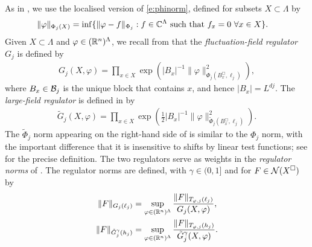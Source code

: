 As in \cite[(\ref{IE-e:PhiXdef})]{BS-rg-IE}, we use the localised version
of \eqref{e:phinorm}, defined for subsets $X \subset \Lambda$  by
\begin{align}
\label{e:PhiXdef}
    \|\varphi\|_{\Phi_j(X)}
    &=
    \inf \{ \|\varphi -f\|_{\Phi_j} :
    \text{$f \in \mathbb{C}^\Lambda$ such that $f_{x} = 0$
    $\forall x\in X$}\}.
\end{align}
Given $X \subset \Lambda$ and $\varphi \in ({\mathbb R}^n)^{\Lambda}$,
we recall from \cite[\eqref{IE-e:GPhidef}]{BS-rg-IE}
that the
\emph{fluctuation-field regulator} $G_j$
is defined by
\begin{align}
\label{e:GPhidef}
    G_j(X,\varphi)
    =
    \prod_{x \in X} \exp
    \left(|B_{x}|^{-1}\|\varphi\|_{\Phi_j (B_{x}^\Box,\ell_j )}^2 \right)
    ,
\end{align}
where $B_{x}\in \mathcal{B}_j$ is the unique block that contains $x$,
and hence $|B_x| = L^{dj}$.
The \emph{large-field regulator} is defined in \cite[\eqref{IE-e:9Gdef}]{BS-rg-IE} by
\begin{align}
\label{e:9Gdef}
    \tilde G_j  (X,\varphi)
    =
    \prod_{x \in X}
    \exp \left(
    \frac 12 |B_{x}|^{-1}\|\varphi\|_{\tilde\Phi_j (B_{x}^\Box,\ell_j)}^2
    \right)
    .
\end{align}
The $\tilde\Phi_j$ norm appearing on the right-hand side of  is
similar to the $\Phi_j$ norm, with the important difference that it is insensitive to
shifts by linear test functions; see \cite[\eqref{IE-e:Phitilnorm}]{BS-rg-IE} for the
precise definition.
The two regulators serve as weights in the \emph{regulator norms} of
\cite[Definition~\ref{IE-def:Gnorms}]{BS-rg-IE}.
The regulator norms are defined,  with $\gamma \in (0,1]$ and
for $F \in \mathcal{N}(X^\Box)$ by
\begin{align}
\label{e:Gnormdef1}
    \| F\|_{G_j(\ell_j)}
    &=
    \sup_{\varphi \in ({\mathbb R}^n)^\Lambda}
    \frac{\|F\|_{T_{\varphi,j}(\ell_j)}}{G_{j}(X,\varphi)}
    ,
\\
\label{e:Gnormdef2}
    \|F\|_{\tilde G_j^{\gamma}(h_j)}
    &=
    \sup_{\varphi \in ({\mathbb R}^n)^\Lambda}
    \frac{\|F \|_{T_{\varphi,j}(h_j)}}{\tilde{G}^{\gamma}_{j}(X,\varphi)}
    .
\end{align}
